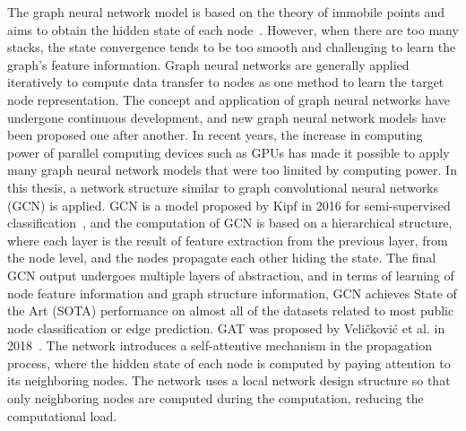 
The graph neural network model is based on the theory of immobile points and aims to obtain the hidden state of each node~\cite{kim2019edge}. However, when there are too many stacks, the state convergence tends to be too smooth and challenging to learn the graph's feature information. Graph neural networks are generally applied iteratively to compute data transfer to nodes as one method to learn the target node representation. The concept and application of graph neural networks have undergone continuous development, and new graph neural network models have been proposed one after another. In recent years, the increase in computing power of parallel computing devices such as GPUs has made it possible to apply many graph neural network models that were too limited by computing power. In this thesis, a network structure similar to graph convolutional neural networks (GCN) is applied. GCN is a model proposed by Kipf in 2016 for semi-supervised classification~\cite{kipf2017semi}, and the computation of GCN is based on a hierarchical structure, where each layer is the result of feature extraction from the previous layer, from the node level, and the nodes propagate each other hiding the state. The final GCN output undergoes multiple layers of abstraction, and in terms of learning of node feature information and graph structure information, GCN achieves State of the Art (SOTA) performance on almost all of the datasets related to most public node classification or edge prediction. GAT was proposed by Veličković et al. in 2018~\cite{veli2018graph}. The network introduces a self-attentive mechanism in the propagation process, where the hidden state of each node is computed by paying attention to its neighboring nodes. The network uses a local network design structure so that only neighboring nodes are computed during the computation, reducing the computational load.

